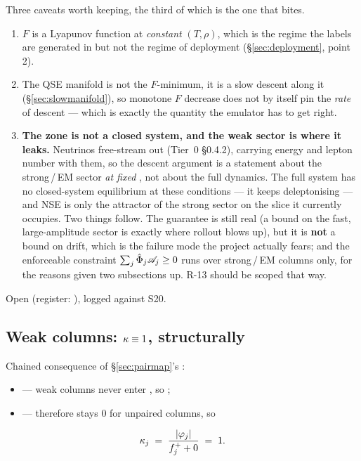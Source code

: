 Three caveats worth keeping, the third of which is the one that bites.

\begin{enumerate}
\item $F$ is a Lyapunov function at \emph{constant} $(T, \rho)$, which is the
  regime the labels are generated in but not the regime of deployment
  (\S\ref{sec:deployment}, point 2).
\item The QSE manifold is not the $F$-minimum, it is a slow descent along it
  (\S\ref{sec:slowmanifold}), so monotone $F$ decrease does not by itself pin
  the \emph{rate} of descent --- which is exactly the quantity the emulator has
  to get right.
\item \textbf{The zone is not a closed system, and the weak sector is where it
  leaks.} Neutrinos free-stream out (Tier~0 \S0.4.2), carrying energy and lepton
  number with them, so the descent argument is a statement about the
  strong\,/\,EM sector \emph{at fixed \Ye}, not about the full dynamics. The
  full system has no closed-system equilibrium at these conditions --- it keeps
  deleptonising --- and NSE is only the attractor of the strong sector on the
  \Ye{} slice it currently occupies. Two things follow. The guarantee is still
  real (a bound on the fast, large-amplitude sector is exactly where rollout
  blows up), but it is \textbf{not} a bound on \Ye{} drift, which is the failure
  mode the project actually fears; and the enforceable constraint
  $\sum_j \hat{\Phi}_j\mathscr{A}_j \ge 0$ runs over strong\,/\,EM columns only, for the
  reasons given two subsections up. R-13 should be scoped that way.
\end{enumerate}

Open (register: ), logged against S20.

\subsection{Weak columns: \texorpdfstring{$\kappa \equiv 1$}{kappa = 1},
            structurally}
\label{sec:weakkappa}

Chained consequence of \S\ref{sec:pairmap}'s :

\begin{itemize}
\item {} --- weak columns never enter , so
  ;
\item {} ---  therefore stays 0 for unpaired
  columns, so
\end{itemize}
%
\begin{equation}
\kappa_j \;=\; \frac{|\varphi_j|}{f^{+}_j + 0} \;=\; 1 .
\label{eq:weakkappaone}
\end{equation}

